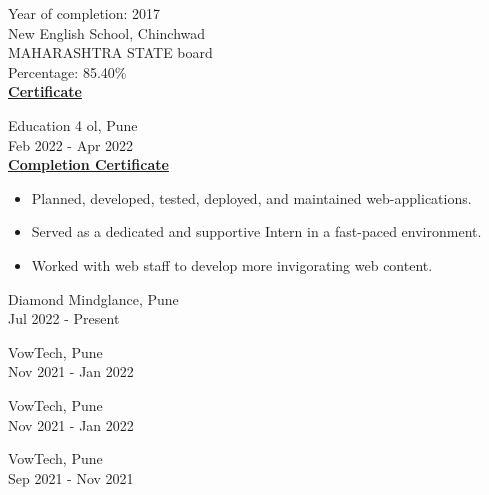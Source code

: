 \documentclass[a4paper,10pt]{memoir} %
\begin{document}

{Year of completion: 2017}\\
{New English School, Chinchwad}\\
{MAHARASHTRA STATE board}\\
Percentage: 85.40\% \\
\textbf{\href{https://drive.google.com/file/d/1wmlNrcPq37uDmdl4n70nkkitifS35O1p/view?usp=sharing}{Certificate}}\\



{Education 4 ol, Pune}\\
{Feb 2022 - Apr 2022}\\
\textbf{\href{https://drive.google.com/file/d/1q4znCxAsUhgCQ-Uyw9eoTgJrF0NGa8YW/view?usp=sharing}{Completion Certificate}}
\begin{itemize}
	\item Planned, developed, tested, deployed, and maintained web-applications.

	\item Served as a dedicated and supportive Intern in a fast-paced environment.

	\item Worked with web staff to develop more invigorating web content.\\
\end{itemize}




{Diamond Mindglance, Pune}\\
{Jul 2022 - Present}\\


{VowTech, Pune}\\
{Nov 2021 - Jan 2022}\\


{VowTech, Pune}\\
{Nov 2021 - Jan 2022}\\


{VowTech, Pune}\\
{Sep 2021 - Nov 2021}\\
\end{document}
